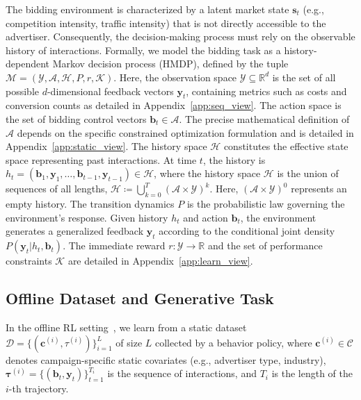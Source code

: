 \documentclass[sigconf, anonymous, review]{acmart}
\begin{document}
The bidding environment is characterized by a latent market state $\mathbf{s}_t$ (e.g., competition intensity, traffic intensity) that is not directly accessible to the advertiser.
Consequently, the decision-making process must rely on the observable history of interactions. 
Formally, we model the bidding task as a history-dependent Markov decision process (HMDP), defined by the tuple $\mathcal{M} = (\mathcal{Y}, \mathcal{A}, \mathcal{H}, P, r, \mathcal{K})$.
Here, the observation space $\mathcal{Y} \subseteq \mathbb{R}^d$ is the set of all possible $d$-dimensional feedback vectors $\mathbf{y}_t$, containing metrics such as costs and conversion counts as detailed in Appendix~\ref{app:seq_view}.
The action space is the set of bidding control vectors $\mathbf{b}_t \in \mathcal{A}$. The precise mathematical definition of $\mathcal{A}$ depends on the specific constrained optimization formulation and is detailed in Appendix~\ref{app:static_view}.
The history space $\mathcal{H}$ constitutes the effective state space representing past interactions. At time $t$, the history is $h_t = (\mathbf{b}_1, \mathbf{y}_1, \dots, \mathbf{b}_{t-1}, \mathbf{y}_{t-1}) \in \mathcal{H}$, where the history space $\mathcal{H}$ is the union of sequences of all lengths, $\mathcal{H} \coloneqq \bigcup_{k=0}^T (\mathcal{A} \times \mathcal{Y})^k$. Here, $(\mathcal{A} \times\mathcal{Y})^0$ represents an empty history.
The transition dynamics $P$ is the probabilistic law governing the environment's response. Given history $h_t$ and action $\mathbf{b}_t$, the environment generates a generalized feedback $\mathbf{y}_t$ according to the conditional joint density $P(\mathbf{y}_t | h_t, \mathbf{b}_t)$.
The immediate reward $r: \mathcal{Y} \to \mathbb{R}$ and the set of performance constraints $\mathcal{K}$ are detailed in Appendix~\ref{app:learn_view}.


\subsection{Offline Dataset and Generative Task}

In the offline RL setting~\cite{levine2020offline}, we learn from a static dataset $\mathcal{D} = \{(\mathbf{c}^{(i)}, \tau^{(i)})\}_{i=1}^L$ of size $L$ collected by a behavior policy, where $\mathbf{c}^{(i)} \in \mathcal{C}$ denotes campaign-specific static covariates (e.g., advertiser type, industry), $\mathbf{\tau}^{(i)} = \{(\mathbf{b}_t, \mathbf{y}_t)\}_{t=1}^{T_i}$ is the sequence of interactions, and $T_i$ is the length of the $i$-th trajectory.
\end{document}
